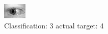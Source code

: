 \begin{figure}[h!]
\begin{center}
\includegraphics[width=0.60\columnwidth]{figures/ID750_class_3_target_4.png}
\end{center}
\caption{ Classification: 3 actual target: 4}
\label{fig:ID750_class_3_target_4}
\end{figure}

